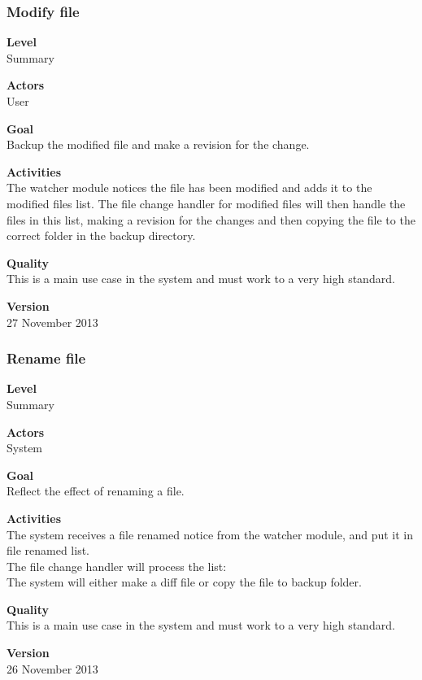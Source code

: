 \documentclass[12pt,a4paper]{article}
\begin{document}
\subsubsection{Modify file}
\begin{description}
	\item \textbf{Level} \\
	Summary
	\item \textbf{Actors} \\
	User
	\item \textbf{Goal} \\
	Backup the modified file and make a revision for the change.
	\item \textbf{Activities} \\
	The watcher module notices the file has been modified and adds it to the modified files list. The file change handler for modified files will then handle the files in this list, making a revision for the changes and then copying the file to the correct folder in the backup directory.
	\item \textbf{Quality} \\
	This is a main use case in the system and must work to a very high standard.
	\item \textbf{Version} \\
	27 November 2013	
\end{description}

\subsubsection{Rename file}
\begin{description}
	\item \textbf{Level} \\
	Summary
	\item \textbf{Actors} \\
	System
	\item \textbf{Goal} \\
	Reflect the effect of renaming a file.
	\item \textbf{Activities} \\
	The system receives a file renamed notice from the watcher module, and put it in file renamed list.\\
	The file change handler will process the list: \\
	The system will either make a diff file or copy the file to backup folder.
	\item \textbf{Quality} \\
	This is a main use case in the system and must work to a very high standard.
	\item \textbf{Version} \\
	26 November 2013	
\end{description}
\end{document}
